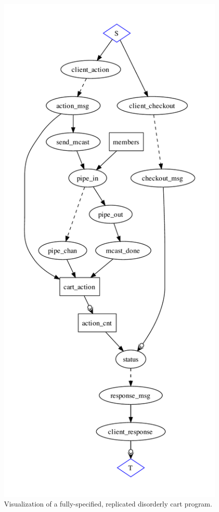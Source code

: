 \begin{figure}[t]
\centering
\includegraphics[width=0.8\linewidth]{fig/disorderly_complete.pdf}
\vspace{-10pt}
\caption{Visualization of a fully-specified, replicated disorderly cart program.}
\label{fig:pdg-disorderly-analysis}
\vspace{-2pt}
\end{figure}



